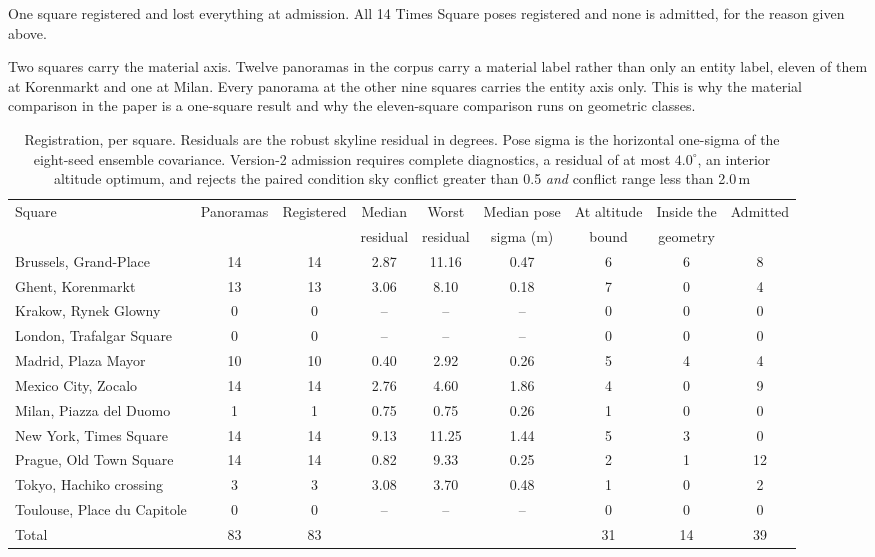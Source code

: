 \documentclass[journal]{IEEEtran}
\begin{document}
One square registered and lost everything at admission. All 14 Times Square
poses registered and none is admitted, for the reason given above.

Two squares carry the material axis. Twelve panoramas in the corpus carry a
material label rather than only an entity label, eleven of them at Korenmarkt
and one at Milan. Every panorama at the other nine squares carries the entity
axis only. This is why the material comparison in the paper is a one-square
result and why the eleven-square comparison runs on geometric classes.

\begin{table}[!t]
  \caption{Registration, per square. Residuals are the robust skyline residual
  in degrees. Pose sigma is the horizontal one-sigma of the eight-seed
  ensemble covariance. Version-2 admission requires complete diagnostics, a
  residual of at most $4.0^\circ$, an interior altitude optimum, and rejects the
  paired condition sky conflict greater than 0.5 \emph{and} conflict range less
  than 2.0\,m}
  \label{tab:si-registration}
  \centering
  \begin{tabular}{lcccccccc}
    \toprule
    Square & Panoramas & Registered & Median & Worst & Median pose & At altitude & Inside the & Admitted \\
     & & & residual & residual & sigma (m) & bound & geometry & \\
    \midrule
    Brussels, Grand-Place        & 14 & 14 & 2.87 & 11.16 & 0.47 & 6 & 6 & 8 \\
    Ghent, Korenmarkt            & 13 & 13 & 3.06 & 8.10  & 0.18 & 7 & 0 & 4 \\
    Krakow, Rynek Glowny         & 0  & 0  & --   & --    & --   & 0 & 0 & 0 \\
    London, Trafalgar Square     & 0  & 0  & --   & --    & --   & 0 & 0 & 0 \\
    Madrid, Plaza Mayor          & 10 & 10 & 0.40 & 2.92  & 0.26 & 5 & 4 & 4 \\
    Mexico City, Zocalo          & 14 & 14 & 2.76 & 4.60  & 1.86 & 4 & 0 & 9 \\
    Milan, Piazza del Duomo      & 1  & 1  & 0.75 & 0.75  & 0.26 & 1 & 0 & 0 \\
    New York, Times Square       & 14 & 14 & 9.13 & 11.25 & 1.44 & 5 & 3 & 0 \\
    Prague, Old Town Square      & 14 & 14 & 0.82 & 9.33  & 0.25 & 2 & 1 & 12 \\
    Tokyo, Hachiko crossing      & 3  & 3  & 3.08 & 3.70  & 0.48 & 1 & 0 & 2 \\
    Toulouse, Place du Capitole  & 0  & 0  & --   & --    & --   & 0 & 0 & 0 \\
    \midrule
    Total                        & 83 & 83 &      &       &      & 31 & 14 & 39 \\
    \bottomrule
  \end{tabular}
\end{table}
\end{document}
